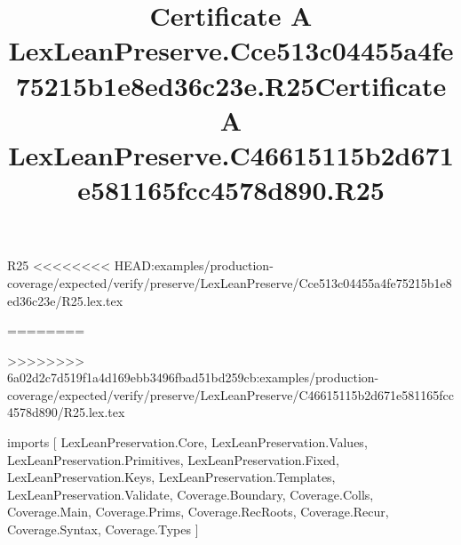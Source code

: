 \begin{lexlean}{R25}
<<<<<<<< HEAD:examples/production-coverage/expected/verify/preserve/LexLeanPreserve/Cce513c04455a4fe75215b1e8ed36c23e/R25.lex.tex
\title{Certificate A LexLeanPreserve.Cce513c04455a4fe75215b1e8ed36c23e.R25}
========
\title{Certificate A LexLeanPreserve.C46615115b2d671e581165fcc4578d890.R25}
>>>>>>>> 6a02d2c7d519f1a4d169ebb3496fbad51bd259cb:examples/production-coverage/expected/verify/preserve/LexLeanPreserve/C46615115b2d671e581165fcc4578d890/R25.lex.tex
\begin{coremodule}
imports [
  LexLeanPreservation.Core,
  LexLeanPreservation.Values,
  LexLeanPreservation.Primitives,
  LexLeanPreservation.Fixed,
  LexLeanPreservation.Keys,
  LexLeanPreservation.Templates,
  LexLeanPreservation.Validate,
  Coverage.Boundary,
  Coverage.Colls,
  Coverage.Main,
  Coverage.Prims,
  Coverage.RecRoots,
  Coverage.Recur,
  Coverage.Syntax,
  Coverage.Types
]


\end{coremodule}
\end{lexlean}
